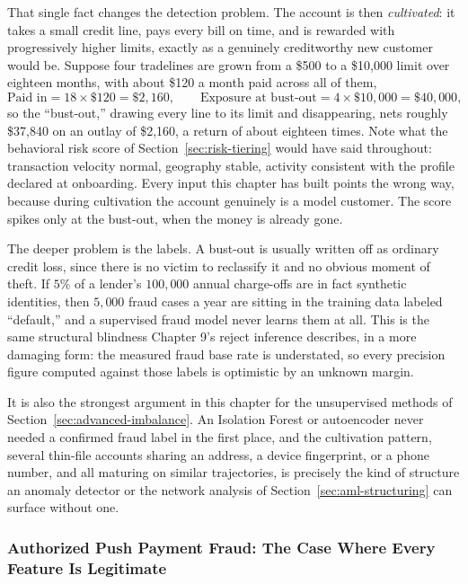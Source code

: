 \documentclass[../ai_in_finance]{subfiles}
\begin{document}
That single fact changes the detection problem. The account is then \emph{cultivated}: it takes a small credit line, pays every bill on time, and is rewarded with progressively higher limits, exactly as a genuinely creditworthy new customer would be. Suppose four tradelines are grown from a \$500 to a \$10,000 limit over eighteen months, with about \$120 a month paid across all of them,
\begin{equation*}
\text{Paid in} = 18 \times \$120 = \$2{,}160, \qquad \text{Exposure at bust-out} = 4 \times \$10{,}000 = \$40{,}000,
\end{equation*}
so the ``bust-out,'' drawing every line to its limit and disappearing, nets roughly \$37,840 on an outlay of \$2,160, a return of about eighteen times. Note what the behavioral risk score of Section~\ref{sec:risk-tiering} would have said throughout: transaction velocity normal, geography stable, activity consistent with the profile declared at onboarding. Every input this chapter has built points the wrong way, because during cultivation the account genuinely is a model customer. The score spikes only at the bust-out, when the money is already gone.

The deeper problem is the labels. A bust-out is usually written off as ordinary credit loss, since there is no victim to reclassify it and no obvious moment of theft. If $5\%$ of a lender's $100{,}000$ annual charge-offs are in fact synthetic identities, then $5{,}000$ fraud cases a year are sitting in the training data labeled ``default,'' and a supervised fraud model never learns them at all. This is the same structural blindness Chapter 9's reject inference describes, in a more damaging form: the measured fraud base rate is understated, so every precision figure computed against those labels is optimistic by an unknown margin.

It is also the strongest argument in this chapter for the unsupervised methods of Section~\ref{sec:advanced-imbalance}. An Isolation Forest or autoencoder never needed a confirmed fraud label in the first place, and the cultivation pattern, several thin-file accounts sharing an address, a device fingerprint, or a phone number, and all maturing on similar trajectories, is precisely the kind of structure an anomaly detector or the network analysis of Section~\ref{sec:aml-structuring} can surface without one.

\subsubsection*{Authorized Push Payment Fraud: The Case Where Every Feature Is Legitimate}
\end{document}
